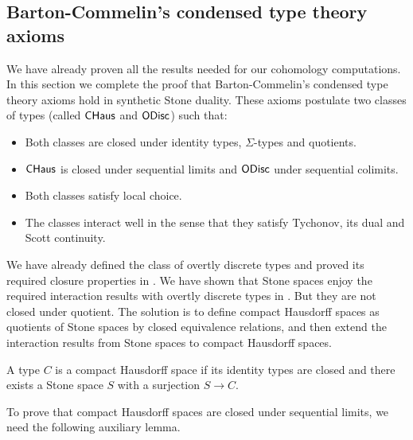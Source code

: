 \subsection{Barton-Commelin's condensed type theory axioms}
\label{barton-commelin}

We have already proven all the results needed for our cohomology computations. In this section we complete the proof that Barton-Commelin's condensed type theory axioms hold in synthetic Stone duality. These axioms postulate two classes of types (called $\mathsf{CHaus}$ and $\mathsf{ODisc}$) such that:
\begin{itemize}
\item Both classes are closed under identity types, $\Sigma$-types and quotients. 
\item $\mathsf{CHaus}$ is closed under sequential limits and $\mathsf{ODisc}$ under sequential colimits.
\item Both classes satisfy local choice.
\item The classes interact well in the sense that they satisfy Tychonov, its dual and Scott continuity.
\end{itemize}

We have already defined the class of overtly discrete types and proved its required closure properties in . We have shown that Stone spaces enjoy the required interaction results with overtly discrete types in . But they are not closed under quotient. The solution is to define compact Hausdorff spaces as quotients of Stone spaces by closed equivalence relations, and then extend the interaction results from Stone spaces to compact Hausdorff spaces.

\begin{definition}
A type $C$ is a compact Hausdorff space if its identity types are closed and there exists a Stone space $S$ with a surjection $S\to C$.
\end{definition}

To prove that compact Hausdorff spaces are closed under sequential limits, we need the following auxiliary lemma.

